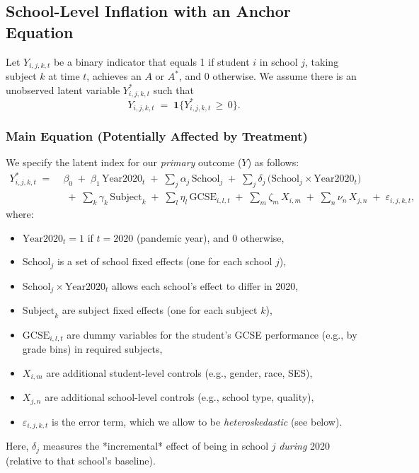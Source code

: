 
\subsection{School-Level Inflation with an Anchor Equation}
\label{sec:baseline_model}

Let $Y_{i,j,k,t}$ be a binary indicator that equals 1 if student $i$ in school $j$, taking subject $k$ at time $t$, achieves an $A$ or $A^*$, and 0 otherwise. We assume there is an unobserved latent variable $Y_{i,j,k,t}^*$ such that
\begin{equation}
    \label{eq:indicator}
    Y_{i,j,k,t}
    \;=\;
    \mathbf{1}\{Y_{i,j,k,t}^* \,\ge\, 0\}.
\end{equation}

\subsubsection*{Main Equation (Potentially Affected by Treatment)}

We specify the latent index for our \emph{primary} outcome ($Y$) as follows:
\begin{align}
    \label{eq:latent_index}
    Y_{i,j,k,t}^*
    \;=\;& \beta_0 
    \;+\;
    \beta_1\,\text{Year2020}_t
    \;+\;
    \sum_{j}\alpha_j\,\text{School}_j 
    \;+\;
    \sum_{j}\delta_j\,\bigl(\text{School}_j \times \text{Year2020}_t\bigr)
    \nonumber \\[-6pt]
    &\;+\;\sum_{k}\gamma_k\,\text{Subject}_k
    \;+\;
    \sum_{l}\eta_{l}\,\text{GCSE}_{i,l,t}
    \;+\;
    \sum_{m}\zeta_m\,X_{i,m}
    \;+\;
    \sum_{n}\nu_n\,X_{j,n}
    \;+\;
    \varepsilon_{i,j,k,t},
\end{align}
where:
\begin{itemize}
    \item \(\text{Year2020}_t = 1\) if $t=2020$ (pandemic year), and 0 otherwise,
    \item \(\text{School}_j\) is a set of school fixed effects (one for each school \(j\)),
    \item \(\text{School}_j \times \text{Year2020}_t\) allows each school’s effect to differ in 2020,
    \item \(\text{Subject}_k\) are subject fixed effects (one for each subject \(k\)), 
    \item \(\text{GCSE}_{i,l,t}\) are dummy variables for the student’s GCSE performance (e.g., by grade bins) in required subjects,
    \item \(X_{i,m}\) are additional student-level controls (e.g., gender, race, SES),
    \item \(X_{j,n}\) are additional school-level controls (e.g., school type, quality),
    \item \(\varepsilon_{i,j,k,t}\) is the error term, which we allow to be \emph{heteroskedastic} (see below).
\end{itemize}
Here, $\delta_j$ measures the *incremental* effect of being in school $j$ \emph{during} 2020 (relative to that school’s baseline).

